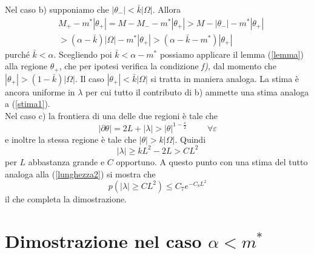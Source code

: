 \documentclass[aps,pre]{revtex4}
\newcommand{\beq}{\begin{equation}}
\newcommand{\eeq}{\end{equation}}
\begin{document}
Nel caso b) supponiamo che $|\theta_-| < \bar{k} |\Omega|$. Allora
\beq
\begin{split}
&M_+ - m^*|\theta_+| = M - M_- - m^* |\theta_+| > M - |\theta_-| - m^* |\theta_+| \\ &> (\alpha-\bar{k})|\Omega| - m^* |\theta_+| > (\alpha - \bar k - m^*) |\theta_+|
\end{split}
\eeq
purch\'e $\bar k < \alpha$. Scegliendo poi $\bar{k} < \alpha - m^*$ possiamo applicare il lemma (\ref{lemma}) alla regione $\theta_+$, che per ipotesi verifica la condizione {\it f)}, dal momento che $|\theta_+| > (1-\bar{k})|\Omega|$. Il caso $|\theta_+| < \bar{k} |\Omega|$ si tratta in maniera analoga. La stima \`e ancora uniforme in $\lambda$ per cui tutto il contributo di b) ammette una stima analoga a (\ref{stima1}). \\
Nel caso c) la frontiera di una delle due regioni \`e tale che
\beq
|\partial \theta| = 2L + |\lambda| > |\theta|^{1-\frac{\varepsilon}{2}} \hspace{1cm} \forall \varepsilon
\eeq
e inoltre la stessa regione \`e tale che $|\theta|> k |\Omega|$. Quindi
\beq
|\lambda| \geq k L^2 - 2 L > C L^2
\eeq
per $L$ abbastanza grande e $C$ opportuno.
A questo punto con una stima del tutto analoga alla (\ref{lunghezza2}) si mostra che
\beq
p(|\lambda| \geq C L^2) \leq C_7 e^{-C_8 L^2}
\eeq
il che completa la dimostrazione.


\section{Dimostrazione nel caso $\alpha < m^*$}
\end{document}
